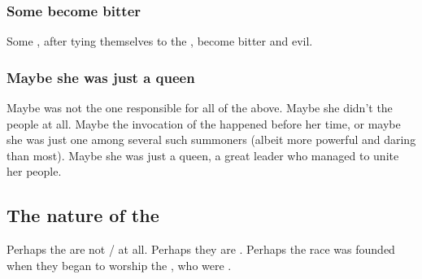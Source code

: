 \subsubsection{Some \Draecchonosh{} become bitter}
Some \draecchonosh, after tying themselves to the \xss, become bitter and evil. 






\subsubsection{Maybe she was just a queen}
Maybe \Kserasshana{} was not the one responsible for all of the above. 
Maybe she didn't  the \dzraicchenoss{} people at all.
Maybe the invocation of the \xss{} happened before her time, or maybe she was just one among several such summoners (albeit more powerful and daring than most). 
Maybe she was just a queen, a great leader who managed to unite her people. 










\subsection{The nature of the \firstgendragons}
Perhaps the  are not \dragons/\ophidians{} at all. Perhaps they are \xss. Perhaps the \draconian{} race was founded when they began to worship the \firstgendragons, who were \xss. 

